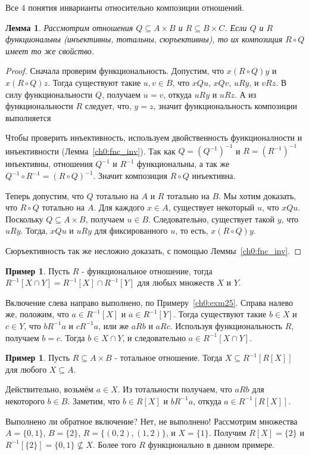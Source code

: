 \documentclass[12pt,notitlepage]{article}
\theoremstyle{plain}
\newtheorem{lemma}[thm]{Лемма}
\theoremstyle{definition}
\newtheorem{exm}[thm]{Пример}
\theoremstyle{plain}
\newcommand{\sbs}{\subseteq}
\newcommand{\1}{\mathbf{1}}
\newcommand{\0}{\mathbf{0}}
\begin{document}
\noindent Все 4 понятия инварианты относительно композиции отношений.
\begin{lemma}\label{ch0:fnc_cmp} Рассмотрим отношения $Q \sbs A \times B$ и $R \sbs B \times C$. Если $Q$ и $R$ функциональны (инъективны, тотальны, сюръективны), то их композиция $R \circ Q$ имеет то же свойство.
\end{lemma}	
\begin{proof}
	Сначала проверим функциональность. Допустим, что $x(R \circ Q)y$ и $x(R \circ Q)z$. Тогда существуют такие $u,v\in B$, что $xQu$, $xQv$, $u R y$, и $v R z$. В силу функциональности $Q$, получаем $u = v$, откуда $u R y$ и $u R z$. А из функциональности $R$ следует, что, $y = z$, значит функциональность композиции выполняется
	
	Чтобы проверить инъективность, используем двойственность функционалности и инъективности (Лемма~\ref{ch0:fnc_inv}). Так как $Q = (Q^{-1})^{-1}$ и $R = (R^{-1})^{-1}$ инъективны, отношения $Q^{-1}$ и $R^{-1}$ функциональны, а так же $Q^{-1} \circ R^{-1} = (R \circ Q)^{-1}$. Значит композиция $R \circ Q$ инъективна.
	
	Теперь допустим, что $Q$ тотально на $A$ и $R$ тотально на $B$. Мы хотим доказать, что $R \circ Q$ тотально на $A$. Для каждого $x \in A$, существует некоторый $u$, что $x Q u$. Поскольку $Q \sbs A \times B$, получаем $u \in B$. Следовательно, существует такой $y$, что $u R y$. Тогда, $x Q u$ и $u R y$ для фиксированного $u$, то есть, $x(R \circ Q)y$.
	
	Сюръективность так же несложно доказать, с помощью Леммы~\ref{ch0:fnc_inv}.
\end{proof}

\begin{exm}
	Пусть $R$ - функциональное отношение, тогда $R^{-1}[X \cap Y] = R^{-1}[X] \cap R^{-1}[Y]$ для любых множеств $X$ и $Y$.
	
	Включение слева направо выполнено, по Примеру~\ref{ch0:exm25}. Справа налево же, положим, что $a \in R^{-1}[X]$ и $a \in R^{-1}[Y]$. Тогда существуют такие $b \in X$ и $c \in Y$, что $bR^{-1}a$ и $cR^{-1}a$, или же $a R b$ и $a R c$. Используя функциональность $R$, получаем $b = c$. Тогда $b \in X \cap Y$, и следовательно $a \in R^{-1}[X \cap Y]$.
\end{exm}

\begin{exm}
	Пусть $R \sbs A \times B$ - тотальное отношение. Тогда $X \sbs R^{-1}[R[X]]$ для любого $X \sbs A$.
	
	Действительно, возьмём $a \in X$. Из тотальности получаем, что $a R b$ для некоторого $b \in B$. Заметим, что $b \in R[X]$ и $b R^{-1} a$, откуда $a \in R^{-1}[R[X]]$.
	
	Выполнено ли обратное включение? Нет, не выполнено! Рассмотрим множества $A = \{0,1\}$, $B = \{2\}$, $R = \{(0,2), (1,2)\}$, и $X = \{1\}$. Получим $R[X] = \{2\}$ и $R^{-1}[\{2\}] = \{0,1\} \not\sbs X$. Более того $R$ функционально в данном примере.
\end{exm}
\end{document}
